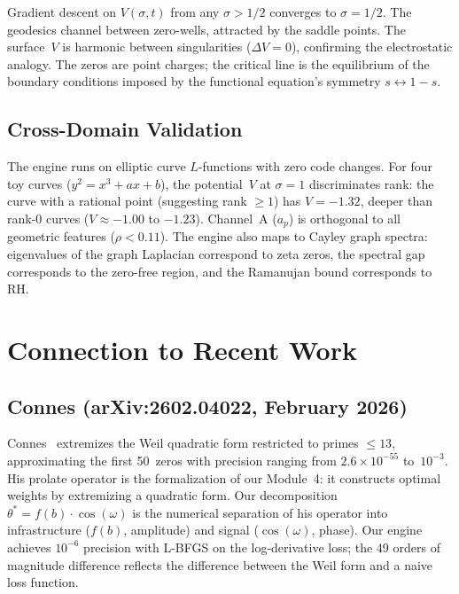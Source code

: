 \documentclass[11pt]{amsart}
\begin{document}
Gradient descent on $V(\sigma,t)$ from any $\sigma > 1/2$ converges to
$\sigma = 1/2$. The geodesics channel between zero-wells, attracted by the
saddle points. The surface~$V$ is harmonic between singularities
($\Delta V = 0$), confirming the electrostatic analogy. The zeros are point
charges; the critical line is the equilibrium of the boundary conditions
imposed by the functional equation's symmetry $s \leftrightarrow 1-s$.

\subsection{Cross-Domain Validation}

The engine runs on elliptic curve $L$-functions with zero code changes. For
four toy curves ($y^2 = x^3 + ax + b$), the potential~$V$ at $\sigma=1$
discriminates rank: the curve with a rational point (suggesting rank
$\ge 1$) has $V = -1.32$, deeper than rank-0 curves ($V \approx -1.00$ to
$-1.23$). Channel~A ($a_p$) is orthogonal to all geometric features
($\rho < 0.11$). The engine also maps to Cayley graph spectra: eigenvalues
of the graph Laplacian correspond to zeta zeros, the spectral gap
corresponds to the zero-free region, and the Ramanujan bound corresponds to
RH.


\section{Connection to Recent Work}
\label{sec:connection}

\subsection{Connes (arXiv:2602.04022, February 2026)}

Connes~\cite{Connes2026} extremizes the Weil quadratic form restricted to primes $\le 13$,
approximating the first 50~zeros with precision ranging from
$2.6\times 10^{-55}$ to~$10^{-3}$. His prolate operator is the
formalization of our Module~4: it constructs optimal weights by extremizing a
quadratic form. Our decomposition $\theta^* = f(b)\cdot\cos(\omega)$ is the
numerical separation of his operator into infrastructure ($f(b)$, amplitude)
and signal ($\cos(\omega)$, phase). Our engine achieves $10^{-6}$ precision
with L-BFGS on the log-derivative loss; the 49 orders of magnitude
difference reflects the difference between the Weil form and a naive loss
function.
\end{document}

